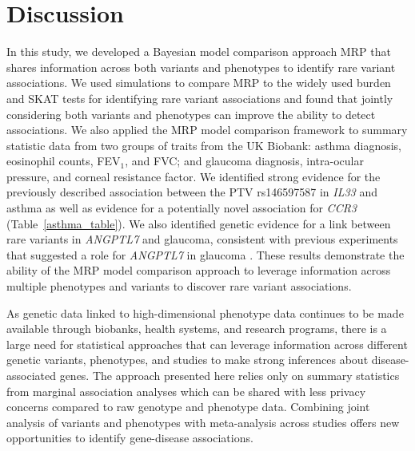 \section*{Discussion}
In this study, we developed a Bayesian model comparison approach MRP that shares information across both variants and phenotypes to identify rare variant associations. We used simulations to compare MRP to the widely used burden and SKAT tests for identifying rare variant associations and found that jointly considering both variants and phenotypes can improve the ability to detect associations. We also applied the MRP model comparison framework to summary statistic data from two groups of traits from the UK Biobank: asthma diagnosis, eosinophil counts, FEV$_1$, and FVC; and glaucoma diagnosis, intra-ocular pressure, and corneal resistance factor. We identified strong evidence for the previously described association between the PTV rs146597587 in \textit{IL33} and asthma\cite{DeBoever179762,10.1371/journal.pgen.1006659} as well as evidence for a potentially novel association for \textit{CCR3} (Table~\ref{asthma_table}). We also identified genetic evidence for a link between rare variants in \textit{ANGPTL7} and glaucoma, consistent with previous experiments that suggested a role for \textit{ANGPTL7} in glaucoma \cite{Comes:2011ex, Kuchtey:2008ek}. These results demonstrate the ability of the MRP model comparison approach to leverage information across multiple phenotypes and variants to discover rare variant associations.

As genetic data linked to high-dimensional phenotype data continues to be made available through biobanks, health systems, and research programs, there is a large need for statistical approaches that can leverage information across different genetic variants, phenotypes, and studies to make strong inferences about disease-associated genes. The approach presented here relies only on summary statistics from marginal association analyses which can be shared with less privacy concerns compared to raw genotype and phenotype data. Combining joint analysis of variants and phenotypes with meta-analysis across studies offers new opportunities to identify gene-disease associations.



